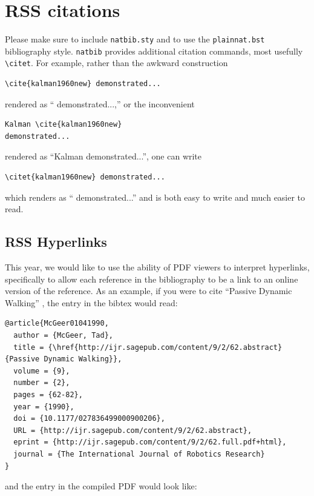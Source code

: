 \section{RSS citations}

Please make sure to include \verb!natbib.sty! and to use the \verb!plainnat.bst! bibliography style.
\verb!natbib! provides additional citation commands, most usefully \verb!\citet!.
For example, rather than the awkward construction

{\small
\begin{verbatim}
\cite{kalman1960new} demonstrated...
\end{verbatim}
}

\noindent
rendered as ``\cite{kalman1960new} demonstrated...,'' or the inconvenient

{\small
\begin{verbatim}
Kalman \cite{kalman1960new} 
demonstrated...
\end{verbatim}
}

\noindent
rendered as ``Kalman \cite{kalman1960new} demonstrated...'', one can write

{\small
\begin{verbatim}
\citet{kalman1960new} demonstrated... 
\end{verbatim}
}
\noindent
which renders as ``\citet{kalman1960new} demonstrated...'' and is both easy to write and much easier to read.
  
\subsection{RSS Hyperlinks}

This year, we would like to use the ability of PDF viewers to interpret hyperlinks, specifically to allow each reference in the bibliography to be a link to an online version of the reference.
As an example, if you were to cite ``Passive Dynamic Walking'' \cite{McGeer01041990}, the entry in the bibtex would read:

{\small
\begin{verbatim}
@article{McGeer01041990,
  author = {McGeer, Tad}, 
  title = {\href{http://ijr.sagepub.com/content/9/2/62.abstract}{Passive Dynamic Walking}}, 
  volume = {9}, 
  number = {2}, 
  pages = {62-82}, 
  year = {1990}, 
  doi = {10.1177/027836499000900206}, 
  URL = {http://ijr.sagepub.com/content/9/2/62.abstract}, 
  eprint = {http://ijr.sagepub.com/content/9/2/62.full.pdf+html}, 
  journal = {The International Journal of Robotics Research}
}
\end{verbatim}
}
\noindent
and the entry in the compiled PDF would look like:

